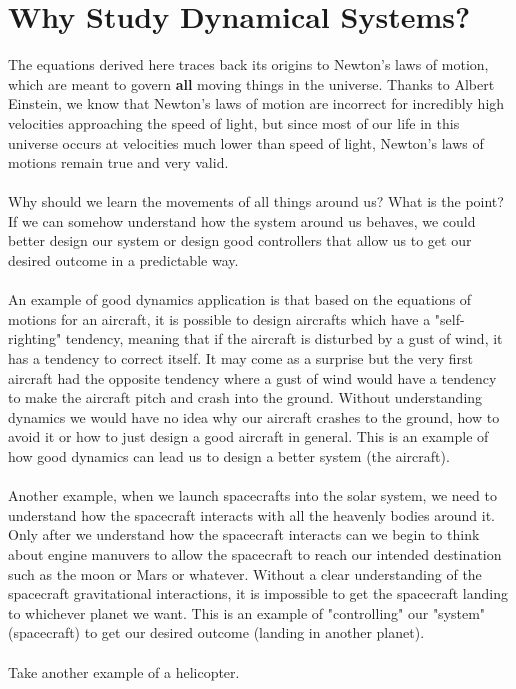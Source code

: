 \chapter{Why Study Dynamical Systems?}

The equations derived here traces back its origins to Newton's laws of motion, which are meant to govern \textbf{all} moving things in the universe.
Thanks to Albert Einstein, we know that Newton's laws of motion are incorrect for incredibly high velocities approaching the speed of light, but since most of our life in this universe occurs at velocities much lower than speed of light, Newton's laws of motions remain true and very valid.
\\~\\Why should we learn the movements of all things around us? 
What is the point?
If we can somehow understand how the system around us behaves, we could better design our system or design good controllers that allow us to get our desired outcome in a predictable way. 
\\~\\An example of good dynamics application is that based on the equations of motions for an aircraft, it is possible to design aircrafts which have a "self-righting" tendency, meaning that if the aircraft is disturbed by a gust of wind, it has a tendency to correct itself.
It may come as a surprise but the very first aircraft had the opposite tendency where a gust of wind would have a tendency to make the aircraft pitch and crash into the ground.
Without understanding dynamics we would have no idea why our aircraft crashes to the ground, how to avoid it or how to just design a good aircraft in general.
This is an example of how good dynamics can lead us to design a better system (the aircraft).
\\~\\Another example, when we launch spacecrafts into the solar system, we need to understand how the spacecraft interacts with all the heavenly bodies around it.
Only after we understand how the spacecraft interacts can we begin to think about engine manuvers to allow the spacecraft to reach our intended destination such as the moon or Mars or whatever.
Without a clear understanding of the spacecraft gravitational interactions, it is impossible to get the spacecraft landing to whichever planet we want.
This is an example of "controlling" our "system" (spacecraft) to get our desired outcome (landing in another planet).
\\~\\Take another example of a helicopter.
